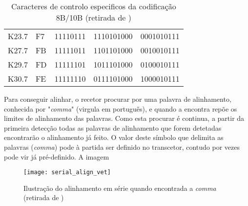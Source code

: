 \begin{table}[h!]
{\begin{tabular}{@{}lllll@{}}
			K23.7                             & F7                                       & 11110111                                       & 1110101000                                          & 0001010111                                          \\
			K27.7                             & FB                                       & 11111011                                       & 1101101000                                          & 0010010111                                          \\
			K29.7                             & FD                                       & 11111101                                       & 1011101000                                          & 0100010111                                          \\
			K30.7                             & FE                                       & 11111110                                       & 0111101000                                          & 1000010111                                          \\ \bottomrule
		\end{tabular}%
	}
	\caption[Caracteres de controlo especificos da codificação 8B/10B]{Caracteres de controlo especificos da codificação 8B/10B (retirada de \cite{R032})}
	\label{table:caracteres_especiais_8b10b}
\end{table}

Para conseguir alinhar, o recetor procurar por uma palavra de alinhamento, conhecida por "\textit{comma}" (virgula em português), e quando a encontra repõe os limites de alinhamento das palavras. Como esta procurar é continua, a partir da primeira detecção todas as palavras de alinhamento que forem detetadas encontrarão o alinhamento já feito. O valor deste símbolo que delimita as palavras (\textit{comma}) pode à partida ser definido no transcetor, contudo por vezes pode vir já pré-definido. A imagem 


\begin{figure}[h!]
	\begin{center}
		\leavevmode
		\texttt{[image: serial\_align\_vet]}
		\caption[Ilustração do alinhamento em série quando encontrada a \textit{comma}]{Ilustração do alinhamento em série quando encontrada a \textit{comma} (retirada de \cite{R011})}
		\label{fig:alinhamento_serie}
	\end{center}
\end{figure}

